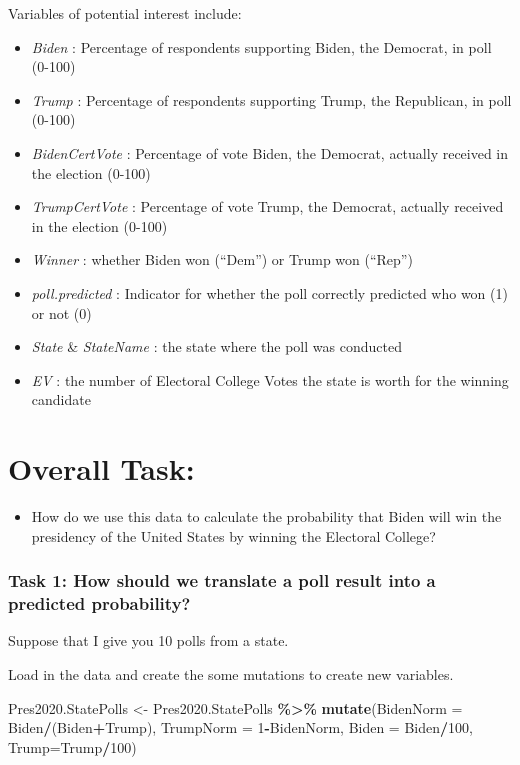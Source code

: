 \documentclass[
]{article}
\newenvironment{Shaded}{\begin{snugshade}}{\end{snugshade}}
\newcommand{\AttributeTok}[1]{\textcolor[rgb]{0.13,0.29,0.53}{#1}}
\newcommand{\DecValTok}[1]{\textcolor[rgb]{0.00,0.00,0.81}{#1}}
\newcommand{\FunctionTok}[1]{\textcolor[rgb]{0.13,0.29,0.53}{\textbf{#1}}}
\newcommand{\NormalTok}[1]{#1}
\newcommand{\OtherTok}[1]{\textcolor[rgb]{0.56,0.35,0.01}{#1}}
\newcommand{\SpecialCharTok}[1]{\textcolor[rgb]{0.81,0.36,0.00}{\textbf{#1}}}
\providecommand{\tightlist}{%
  \setlength{\itemsep}{0pt}\setlength{\parskip}{0pt}}
\begin{document}
Variables of potential interest include:

\begin{itemize}
\tightlist
\item
  \emph{Biden} : Percentage of respondents supporting Biden, the
  Democrat, in poll (0-100)
\item
  \emph{Trump} : Percentage of respondents supporting Trump, the
  Republican, in poll (0-100)
\item
  \emph{BidenCertVote} : Percentage of vote Biden, the Democrat,
  actually received in the election (0-100)
\item
  \emph{TrumpCertVote} : Percentage of vote Trump, the Democrat,
  actually received in the election (0-100)
\item
  \emph{Winner} : whether Biden won (``Dem'') or Trump won (``Rep'')
\item
  \emph{poll.predicted} : Indicator for whether the poll correctly
  predicted who won (1) or not (0)
\item
  \emph{State} \& \emph{StateName} : the state where the poll was
  conducted
\item
  \emph{EV} : the number of Electoral College Votes the state is worth
  for the winning candidate
\end{itemize}

\section{Overall Task:}\label{overall-task}

\begin{itemize}
\tightlist
\item
  How do we use this data to calculate the probability that Biden will
  win the presidency of the United States by winning the Electoral
  College?
\end{itemize}

\subsubsection{Task 1: How should we translate a poll result into a
predicted
probability?}\label{task-1-how-should-we-translate-a-poll-result-into-a-predicted-probability}

Suppose that I give you 10 polls from a state.

Load in the data and create the some mutations to create new variables.

\begin{Shaded}
\begin{Highlighting}[]
\NormalTok{Pres2020.StatePolls }\OtherTok{\textless{}{-}}\NormalTok{ Pres2020.StatePolls }\SpecialCharTok{\%\textgreater{}\%}
   \FunctionTok{mutate}\NormalTok{(}\AttributeTok{BidenNorm =}\NormalTok{ Biden}\SpecialCharTok{/}\NormalTok{(Biden}\SpecialCharTok{+}\NormalTok{Trump),}
          \AttributeTok{TrumpNorm =} \DecValTok{1}\SpecialCharTok{{-}}\NormalTok{BidenNorm,}
          \AttributeTok{Biden =}\NormalTok{ Biden}\SpecialCharTok{/}\DecValTok{100}\NormalTok{,}
          \AttributeTok{Trump=}\NormalTok{Trump}\SpecialCharTok{/}\DecValTok{100}\NormalTok{)}
\end{Highlighting}
\end{Shaded}
\end{document}
